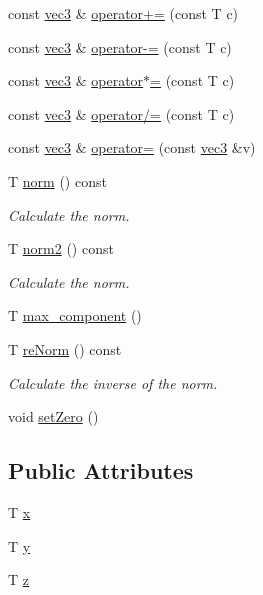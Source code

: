 \begin{DoxyCompactItemize}
\item 
const \mbox{\hyperlink{struct_space_h_1_1vec3}{vec3}} \& \mbox{\hyperlink{struct_space_h_1_1vec3_a444d5277ca3ad78b88dbba50d45007f1}{operator+=}} (const T c)
\item 
const \mbox{\hyperlink{struct_space_h_1_1vec3}{vec3}} \& \mbox{\hyperlink{struct_space_h_1_1vec3_a78f7adf1ccf20819b5c9a536762933e0}{operator-\/=}} (const T c)
\item 
const \mbox{\hyperlink{struct_space_h_1_1vec3}{vec3}} \& \mbox{\hyperlink{struct_space_h_1_1vec3_ad4d8983185e2a69b9478c6f2baad2d36}{operator$\ast$=}} (const T c)
\item 
const \mbox{\hyperlink{struct_space_h_1_1vec3}{vec3}} \& \mbox{\hyperlink{struct_space_h_1_1vec3_afd7ec569421aa04734cebdb346b9bdbf}{operator/=}} (const T c)
\item 
const \mbox{\hyperlink{struct_space_h_1_1vec3}{vec3}} \& \mbox{\hyperlink{struct_space_h_1_1vec3_a958945cd614424f1c11daf9397370f6a}{operator=}} (const \mbox{\hyperlink{struct_space_h_1_1vec3}{vec3}} \&v)
\item 
T \mbox{\hyperlink{struct_space_h_1_1vec3_aeec869b0802a468ffff325efb2d0e780}{norm}} () const
\begin{DoxyCompactList}\small\item\em Calculate the norm. \end{DoxyCompactList}\item 
T \mbox{\hyperlink{struct_space_h_1_1vec3_a62dcbdc184d4228da839845c7e179eea}{norm2}} () const
\begin{DoxyCompactList}\small\item\em Calculate the norm. \end{DoxyCompactList}\item 
T \mbox{\hyperlink{struct_space_h_1_1vec3_a5bf7ae47f97a2269748d66933d719bd9}{max\+\_\+component}} ()
\item 
T \mbox{\hyperlink{struct_space_h_1_1vec3_a90d3f8ac98cf17cb20986997daaf9e0e}{re\+Norm}} () const
\begin{DoxyCompactList}\small\item\em Calculate the inverse of the norm. \end{DoxyCompactList}\item 
void \mbox{\hyperlink{struct_space_h_1_1vec3_ad2e7b91b843f84633372857718f1b5ba}{set\+Zero}} ()
\end{DoxyCompactItemize}
\subsection*{Public Attributes}
\begin{DoxyCompactItemize}
\item 
T \mbox{\hyperlink{struct_space_h_1_1vec3_a5fc1d6e363cfd8ed5835576d2b8c8163}{x}}
\item 
T \mbox{\hyperlink{struct_space_h_1_1vec3_a28ae016a54c1d0929b16a4b80a7b286f}{y}}
\item 
T \mbox{\hyperlink{struct_space_h_1_1vec3_a079eb453e23db2c765449e211400c2ac}{z}}
\end{DoxyCompactItemize}
